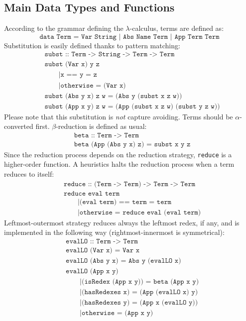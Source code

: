\subsection{Main Data Types and Functions}
According to the grammar defining the $\lambda$-calculus, terms are defined as:
$$
\texttt{data Term = Var String | Abs Name Term | App Term Term}
$$
Substitution is easily defined thanks to pattern matching:
\begin{align*}
&\texttt{subst :: Term -> String -> Term -> Term}\\
&\texttt{subst (Var x) y z}\\
&\qquad\texttt{|x == y = z}\\
&\qquad\texttt{|otherwise = (Var x)}\\
&\texttt{subst (Abs y x) z w = (Abs y (subst x z w))}\\
&\texttt{subst (App x y) z w = (App (subst x z w) (subst y z w))}
\end{align*}
Please note that this substitution is \emph{not} capture avoiding. Terms should be $\alpha$-converted first. $\beta$-reduction is defined as usual:
\begin{align*}
&\texttt{beta :: Term -> Term}\\
&\texttt{beta (App (Abs y x) z) = subst x y z}
\end{align*}
Since the reduction process depends on the reduction strategy, \texttt{reduce} is a higher-order function. A heuristics halts the reduction process when a term reduces to itself:
\begin{align*}
&\texttt{reduce :: (Term -> Term) -> Term -> Term}\\
&\texttt{reduce eval term}\\
&\qquad\texttt{|(eval term) == term = term}\\
&\qquad\texttt{|otherwise = reduce eval (eval term)}
\end{align*}
Leftmost-outermost strategy reduces always the leftmost redex, if any, and is implemented in the following way (rightmost-innermost is symmetrical):
\begin{align*}
&\texttt{evalLO :: Term -> Term}\\
&\texttt{evalLO (Var x) = Var x}\\
&\texttt{evalLO (Abs y x) = Abs y (evalLO x)}\\
&\texttt{evalLO (App x y)}\\
&\qquad\texttt{|(isRedex (App x y)) = beta (App x y)}\\
&\qquad\texttt{|(hasRedexes x) = (App (evalLO x) y)}\\
&\qquad\texttt{|(hasRedexes y) = (App x (evalLO y))}\\
&\qquad\texttt{|otherwise = (App x y)}
\end{align*}
